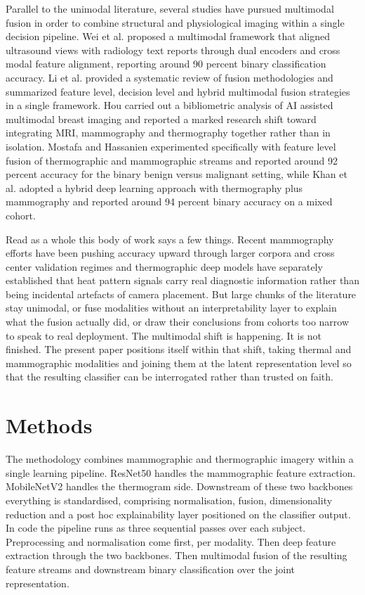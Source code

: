 \documentclass[lettersize,journal]{IEEEtran}
\begin{document}
Parallel to the unimodal literature, several studies have pursued multimodal fusion in order to combine structural and physiological imaging within a single decision pipeline. Wei et al. \cite{Wei2025} proposed a multimodal framework that aligned ultrasound views with radiology text reports through dual encoders and cross modal feature alignment, reporting around 90 percent binary classification accuracy. Li et al. \cite{Li2025review} provided a systematic review of fusion methodologies and summarized feature level, decision level and hybrid multimodal fusion strategies in a single framework. Hou \cite{Hou2025} carried out a bibliometric analysis of AI assisted multimodal breast imaging and reported a marked research shift toward integrating MRI, mammography and thermography together rather than in isolation. Mostafa and Hassanien \cite{mostafa2022multi} experimented specifically with feature level fusion of thermographic and mammographic streams and reported around 92 percent accuracy for the binary benign versus malignant setting, while Khan et al. \cite{khan2023hybrid} adopted a hybrid deep learning approach with thermography plus mammography and reported around 94 percent binary accuracy on a mixed cohort.

Read as a whole this body of work says a few things. Recent mammography efforts have been pushing accuracy upward through larger corpora and cross center validation regimes and thermographic deep models have separately established that heat pattern signals carry real diagnostic information rather than being incidental artefacts of camera placement. But large chunks of the literature stay unimodal, or fuse modalities without an interpretability layer to explain what the fusion actually did, or draw their conclusions from cohorts too narrow to speak to real deployment. The multimodal shift is happening. It is not finished. The present paper positions itself within that shift, taking thermal and mammographic modalities and joining them at the latent representation level so that the resulting classifier can be interrogated rather than trusted on faith.



\section{Methods}

The methodology combines mammographic and thermographic imagery within a single learning pipeline. ResNet50 handles the mammographic feature extraction. MobileNetV2 handles the thermogram side. Downstream of these two backbones everything is standardised, comprising normalisation, fusion, dimensionality reduction and a post hoc explainability layer positioned on the classifier output. In code the pipeline runs as three sequential passes over each subject. Preprocessing and normalisation come first, per modality. Then deep feature extraction through the two backbones. Then multimodal fusion of the resulting feature streams and downstream binary classification over the joint representation.
\end{document}
